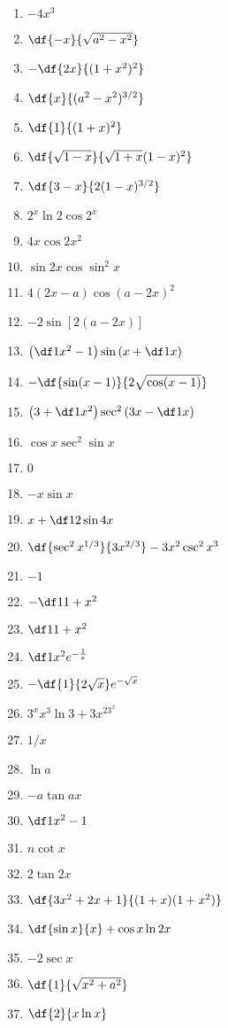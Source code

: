 \begin{enumerate}
  \item $-4x^3$
  \item $\df{-x}{\sqrt{a^2-x^2}}$
  \item $-\df{2x}{(1+x^2)^2}$
  \item $\df{x}{(a^2-x^2)^{3/2}}$
  \item $\df{1}{(1+x)^2}$
  \item $\df{\sqrt{1-x}}{\sqrt{1+x}(1-x)^2}$
  \item $\df{3-x}{2(1-x)^{3/2}}$
  \item $2^x\ln2\cos2^x$
  \item $4x\cos 2x^2$
  \item $\sin 2x\cos\sin^2x$
  \item $4(2x-a)\cos(a-2x)^2$
  \item $-2\sin[2(a-2x)]$
  \item $\left(\df 1{x^2}-1\right)\sin\left(x+\df 1x\right)$
  \item $-\df{\sin(x-1)}{2\sqrt{\cos(x-1)}}$
  \item $\left(3+\df 1{x^2}\right)\sec^2\left(3x-\df 1x\right)$
  \item $\cos x\sec^2\sin x$
  \item $0$
  \item $-x\sin x$
  \item $x+\df 12\sin 4x$
  \item $\df{\sec^2x^{1/3}}{3x^{2/3}}-3x^2\csc^2x^3$
  \item $-1$
  \item $-\df1{1+x^2}$
  \item $\df1{1+x^2}$
  \item $\df1{x^2}e^{-\frac1x}$
  \item $-\df{1}{2\sqrt x}e^{-\sqrt x}$
  \item $3^xx^3\ln3+3x^23^x$
  \item $1/x$
  \item $\ln a$
  \item $-a\tan ax$
  \item $\df1{x^2-1}$
  \item $n\cot x$
  \item $2\tan 2x$
  \item $\df{3x^2+2x+1}{(1+x)(1+x^2)}$
  \item $\df{\sin x}{x}+\cos x\ln 2x$
  \item $-2\sec x$
  \item $\df{1}{\sqrt{x^2+a^2}}$
  \item $\df{2}{x\ln x}$

\end{enumerate}
